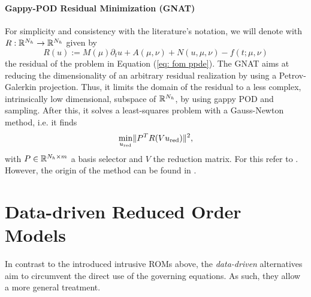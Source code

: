 \paragraph{Gappy-POD Residual Minimization (GNAT)}

For simplicity and consistency with the literature's notation, we will denote with $R: \mathbb{R}^{N_h} \to \mathbb{R}^{N_h}$
given by
\begin{equation*}
    R(u) := M(\mu) \partial_t u + A(\mu, \nu) + N(u, \mu, \nu) - f(t; \mu, \nu)
\end{equation*}
the residual of the problem in Equation (\ref{eq: fom ppde}). The GNAT aims at reducing the dimensionality
of an arbitrary residual realization by using a Petrov-Galerkin projection. Thus, it limits the domain of the
residual to a less complex, intrinsically low dimensional, subspace of $\mathbb{R}^{N_h}$, by using
gappy POD and sampling. After this, it
solves a least-squares problem with a Gauss-Newton method, i.e. it finds
\begin{equation*}
    \min\limits_{u_\text{red}} \lVert P^T R(V u_\text{red}) \rVert^2,
\end{equation*}
with $P \in \mathbb{R}^{N_h \times m}$ a basis selector and $V$ the reduction matrix.
For this refer to \cite{carlberg2013}.
However, the origin of the method can be found in \cite{carlberg2011}.







\section{Data-driven Reduced Order Models} \label{section: data-driven ROMs}




In contrast to the introduced intrusive ROMs above, the \emph{data-driven} alternatives aim to circumvent 
the direct use of the governing equations. As such, they allow a more general treatment.

